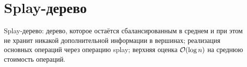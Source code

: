 \section{Splay-дерево}
Splay-дерево: дерево, которое остаётся сбалансированным
в среднем и при этом не хранит никакой
дополнительной информации в вершинах;
реализация основных операций через операцию splay;
верхняя оценка $\mathcal{O}(\log n)$ на среднюю стоимость операций.
